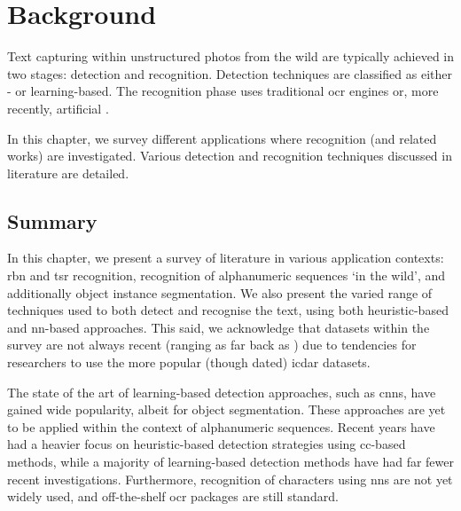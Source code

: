 \chapter{Background}
\label{ch:background}


Text capturing within unstructured photos from the wild are typically achieved in two stages: detection and recognition. Detection techniques are classified as either - or learning-based. The recognition phase uses traditional \gls{ocr} engines or, more recently, artificial . 

In this chapter, we survey different applications where  recognition (and related works) are investigated. Various detection and recognition techniques discussed in literature are detailed.





\newpage
\section{Summary}

In this chapter, we present a survey of literature in various application contexts: \gls{rbn} and \gls{tsr} recognition, recognition of alphanumeric sequences `in the wild', and additionally object instance segmentation. We also present the varied range of techniques used to both detect and recognise the text, using both heuristic-based and \gls{nn}-based approaches. This said, we acknowledge that datasets within the survey are not always recent (ranging as far back as \citeyear{Lucas:2003iw}) due to tendencies for researchers to use the more popular (though dated) \gls{icdar} datasets.

The state of the art of learning-based detection approaches, such as \glspl{cnn}, have gained wide popularity, albeit for object segmentation. These approaches are yet to be applied within the context of alphanumeric sequences. Recent years have had a heavier focus on heuristic-based detection strategies using \gls{cc}-based methods, while a majority of learning-based detection methods have had far fewer recent investigations. Furthermore, recognition of characters using \glspl{nn} are not yet widely used, and off-the-shelf \gls{ocr} packages are still standard.